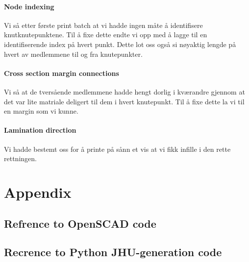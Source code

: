 \documentclass{report}
\begin{document}
\subsubsection {Node indexing}

Vi så etter første print batch at vi hadde ingen måte å identifisere knutknutepunktene. Til å fixe dette endte vi opp med å lagge til en identifiserende index på hvert punkt. Dette lot oss også si nøyaktig lengde på hvert av medlemmene til og fra knutepunkter.

\subsubsection {Cross section margin connections}

Vi så at de tversående medlemmene hadde hengt dorlig i kværandre gjennom at det var lite matriale deligert til dem i hvert knutepunkt. Til å fixe dette la vi til en margin som vi kunne.

\subsubsection {Lamination direction}

Vi hadde bestemt oss for å printe på sånn et vis at vi fikk infille i den rette rettningen.

\chapter{Appendix}

\section{Refrence to OpenSCAD code}
\label{sec:openscad}



\section{Recrence to Python JHU-generation code}
\label{sec:jhu-gen}



\listoffigures

% 
\end{document}
